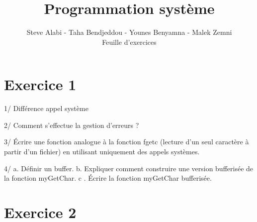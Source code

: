 
\usepackage[right=3cm, left=3cm, bottom=3cm, top=2.2cm, footskip=1.5cm,]{geometry}

\title{\textbf{\Huge Programmation système}}
\author{
	Steve Alabi - Taha Bendjeddou - Younes Benyamna - Malek Zemni
	\vspace{1em}\\
	Feuille d'exercices
	\vspace{0.5em}
}


\maketitle

	\section*{Exercice 1}
	
	
	1/ Différence appel système 
	
	2/ Comment s'effectue la gestion d'erreurs ? 
	
	3/ Écrire une fonction analogue à la fonction fgetc (lecture d'un seul caractère à partir d'un fichier) en utilisant uniquement des appels systèmes.
	
	4/ a. Définir un buffer. 
		b. Expliquer comment construire une version bufferisée de la fonction myGetChar.
		c . Écrire la fonction myGetChar bufferisée.
	
	\section*{Exercice 2}
	
	
